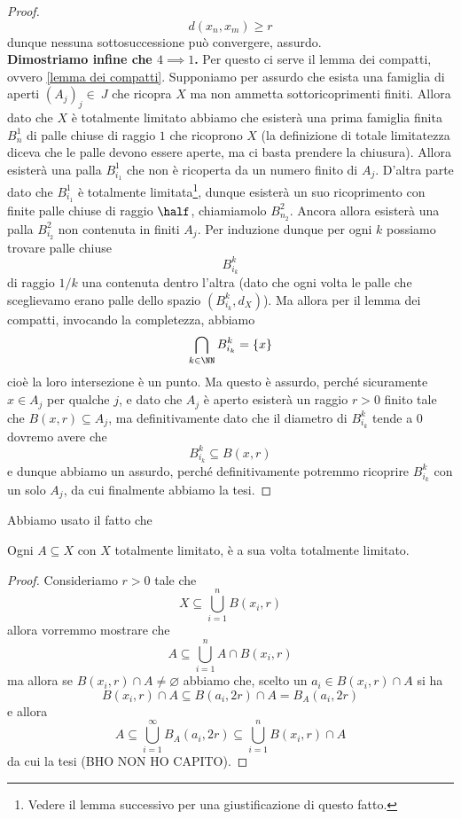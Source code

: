 \documentclass[11pt]{scrartcl}
\newcommand{\eset}{\varnothing}
\begin{document}
\begin{proof}
		$$d(x_n,x_m)\ge r$$
		dunque nessuna sottosuccessione può convergere, assurdo. \\
		\textbf{Dimostriamo infine che $4\implies 1$.} Per questo ci serve il lemma dei compatti, ovvero \ref{lemma dei compatti}. Supponiamo per assurdo che esista una famiglia di aperti $\left(A_j\right)_j\in\ J$ che ricopra $X$ ma non ammetta sottoricoprimenti finiti. Allora dato che $X$ è totalmente limitato abbiamo che esisterà una prima famiglia finita $B^1_n$ di palle chiuse di raggio $1$ che ricoprono $X$ (la definizione di totale limitatezza diceva che le palle devono essere aperte, ma ci basta prendere la chiusura). Allora esisterà una palla $B_{i_1}^1$ che non è ricoperta da un numero finito di $A_j$. D'altra parte dato che $B_{i_1}^1$ è totalmente limitata\footnote{Vedere il lemma successivo per una giustificazione di questo fatto.}, dunque esisterà un suo ricoprimento con finite palle chiuse di raggio $\half$, chiamiamolo $B^2_{n_2}$. Ancora allora esisterà una palla $B^2_{i_2}$ non contenuta in finiti $A_j$. Per induzione dunque per ogni $k$ possiamo trovare palle chiuse
		$$B^k_{i_k}$$
		di raggio $1/k$ una contenuta dentro l'altra (dato che ogni volta le palle che sceglievamo erano palle dello spazio $(B_{i_k}^k,d_X)$). Ma allora per il lemma dei compatti, invocando la completezza, abbiamo
		$$\bigcap_{k\in \NN}B_{i_k}^k=\left\{x\right\}$$
		cioè la loro intersezione è un punto. Ma questo è assurdo, perché sicuramente $x\in A_j$ per qualche $j$, e dato che $A_j$ è aperto esisterà un raggio $r>0$ finito tale che $B(x,r)\subseteq A_j$, ma definitivamente dato che il diametro di $B_{i_k}^k$ tende a $0$ dovremo avere che 
		$$B_{i_k}^k\subseteq B(x,r)$$
		e dunque abbiamo un assurdo, perché definitivamente potremmo ricoprire $B_{i_k}^k$ con un solo $A_j$, da cui finalmente abbiamo la tesi.
	\end{proof}
	Abbiamo usato il fatto che 
	\begin{lemma}
		Ogni $A\subseteq X$ con $X$ totalmente limitato, è a sua volta totalmente limitato.
	\end{lemma}
	\begin{proof}
		Consideriamo $r>0$ tale che 
		$$X\subseteq \bigcup_{i=1}^n B(x_i,r)$$
		allora vorremmo mostrare che 
		$$A\subseteq \bigcup_{i=1}^n A\cap B(x_i,r)$$
		ma allora se $B(x_i,r)\cap A\ne \eset$ abbiamo che, scelto un $a_i\in B(x_i,r)\cap A$ si ha 
		$$B(x_i,r)\cap A \subseteq B(a_i,2r)\cap A=B_A(a_i,2r)$$
		e allora 
		$$A\subseteq \bigcup_{i=1}^\infty B_A(a_i,2r)\subseteq \bigcup_{i=1}^n B(x_i,r)\cap A$$
		da cui la tesi (BHO NON HO CAPITO).
	\end{proof}
\end{document}

